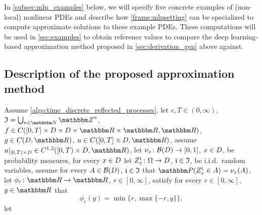 In \cref{subsec:mlp_examples} below, we will specify five concrete examples of (non-local) nonlinear PDEs and describe how \cref{frame:mlpsetting} can be specialized to compute approximate solutions to these example PDEs. These computations will be used in \cref{sec:examples} to obtain reference values to compare the deep learning-based approximation method proposed in \cref{sec:derivation_gen} above against.



\subsection{Description of the proposed approximation method}
\label{subsec:mlpmethod}
\begin{algo}\label{frame:mlpsetting}
	Assume 
		\cref{algo:time_discrete_reflected_processes},
	let
		$c,T\in (0,\infty)$, 
		$\Index = \bcup_{n\in \N} \Z^n$,
		$f \in C([0,T]\times D \times D \times \R \times \R,\R)$, 
		$g\in C(D,\R)$, 
		$u \in C([0,T]\times \D, \R)$, 
	assume
		$u\vert_{[0,T)\times \D}\in C^{1,2}([0,T)\times \D,\R)$, 
	let
		$\nu_x \colon \mathcal{B}( D )\to [0,1]$,
		$x \in D$,
		be probability measures, 
	for every
		$x \in D$
	let
		$ {Z}^{\mathfrak{i} }_{ x } \colon \Omega \to D $,
		$\mathfrak{i} \in \mathfrak{I}$,
		be i.i.d.\ random variables, 
	assume for every
		$ A \in \mathcal{B}( D ) $,
		$\mathfrak{i} \in \mathfrak{I}$
	that
		$\P( \Zz_{ x }^{ \dindex } \in A ) = \nu_x( A )$,
	let 
		$ \phi_r \colon \R \rightarrow \R$,
		$r\in [0,\infty]$, 
	satisfy 
		for every 
			$r\in [0,\infty]$, 
			$y \in \R$ 
		that
		\begin{equation}
			\phi_r(y) = \min\{r,\max\{-r,y\}\},
		\end{equation}
	let 

\end{algo}
